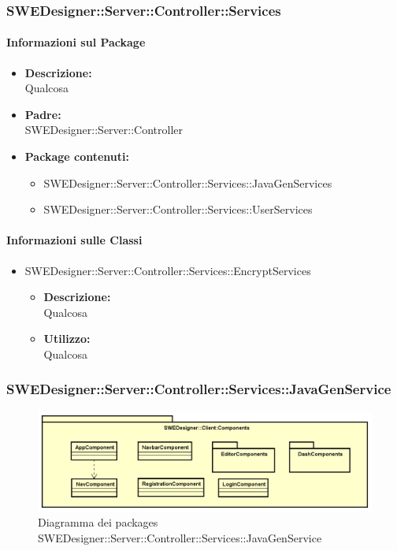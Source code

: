 	
		\subsubsection{SWEDesigner::Server::Controller::Services}
		\paragraph{Informazioni sul Package}
		\begin{itemize}				
			\item \textbf{Descrizione: }\\
			Qualcosa
			\item \textbf{Padre: }\\ SWEDesigner::Server::Controller
			\item \textbf{Package contenuti: }
			\begin{itemize}
				\item SWEDesigner::Server::Controller::Services::JavaGenServices
				\item SWEDesigner::Server::Controller::Services::UserServices
			\end{itemize}
		\end{itemize}
		\paragraph{Informazioni sulle Classi}
		\begin{itemize}
			\item SWEDesigner::Server::Controller::Services::EncryptServices
			\begin{itemize}
				\item \textbf{Descrizione: }\\
				Qualcosa
				\item \textbf{Utilizzo: }\\
				Qualcosa
			\end{itemize}
		\end{itemize}
		
		\subsubsection{SWEDesigner::Server::Controller::Services::JavaGenService}
		\begin{figure}[h!]
		\centering
		\includegraphics[scale=0.4]{Disegnetti/SWEDesigner__Client_Components.png}
		\caption{Diagramma dei packages SWEDesigner::Server::Controller::Services::JavaGenService}
 		\end{figure}		
